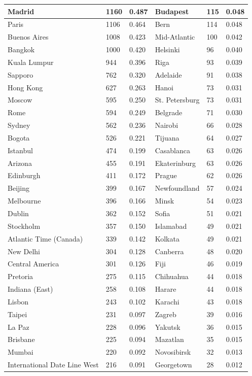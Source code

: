 \begin{tabular}{| l | l | l | l | l | l |}
Madrid	&	1160	&	0.487	&	Budapest	&	115	&	0.048	\\ \hline
Paris	&	1106	&	0.464	&	Bern	&	114	&	0.048	\\ \hline
Buenos Aires	&	1008	&	0.423	&	Mid-Atlantic	&	100	&	0.042	\\ \hline
Bangkok	&	1000	&	0.420	&	Helsinki	&	96	&	0.040	\\ \hline
Kuala Lumpur	&	944	&	0.396	&	Riga	&	93	&	0.039	\\ \hline
Sapporo	&	762	&	0.320	&	Adelaide	&	91	&	0.038	\\ \hline
Hong Kong	&	627	&	0.263	&	Hanoi	&	73	&	0.031	\\ \hline
Moscow	&	595	&	0.250	&	St. Petersburg	&	73	&	0.031	\\ \hline
Rome	&	594	&	0.249	&	Belgrade	&	71	&	0.030	\\ \hline
Sydney	&	562	&	0.236	&	Nairobi	&	66	&	0.028	\\ \hline
Bogota	&	526	&	0.221	&	Tijuana	&	64	&	0.027	\\ \hline
Istanbul	&	474	&	0.199	&	Casablanca	&	63	&	0.026	\\ \hline
Arizona	&	455	&	0.191	&	Ekaterinburg	&	63	&	0.026	\\ \hline
Edinburgh	&	411	&	0.172	&	Prague	&	62	&	0.026	\\ \hline
Beijing	&	399	&	0.167	&	Newfoundland	&	57	&	0.024	\\ \hline
Melbourne	&	396	&	0.166	&	Minsk	&	54	&	0.023	\\ \hline
Dublin	&	362	&	0.152	&	Sofia	&	51	&	0.021	\\ \hline
Stockholm	&	357	&	0.150	&	Islamabad	&	49	&	0.021	\\ \hline
Atlantic Time (Canada)	&	339	&	0.142	&	Kolkata	&	49	&	0.021	\\ \hline
New Delhi	&	304	&	0.128	&	Canberra	&	48	&	0.020	\\ \hline
Central America	&	301	&	0.126	&	Fiji	&	46	&	0.019	\\ \hline
Pretoria	&	275	&	0.115	&	Chihuahua	&	44	&	0.018	\\ \hline
Indiana (East)	&	258	&	0.108	&	Harare	&	44	&	0.018	\\ \hline
Lisbon	&	243	&	0.102	&	Karachi	&	43	&	0.018	\\ \hline
Taipei	&	231	&	0.097	&	Zagreb	&	39	&	0.016	\\ \hline
La Paz	&	228	&	0.096	&	Yakutsk	&	36	&	0.015	\\ \hline
Brisbane	&	225	&	0.094	&	Mazatlan	&	35	&	0.015	\\ \hline
Mumbai	&	220	&	0.092	&	Novosibirsk	&	32	&	0.013	\\ \hline
International Date Line West	&	216	&	0.091	&	Georgetown	&	28	&	0.012	\\ \hline
\end{tabular}

